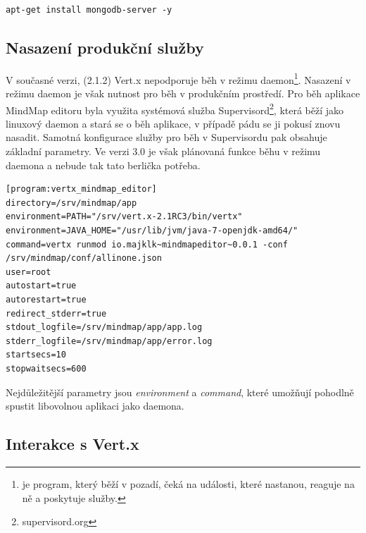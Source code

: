 \begin{lstlisting}
apt-get install mongodb-server -y
\end{lstlisting}

\subsection{Nasazení produkční služby}\label{sub:service}

V současné verzi, (2.1.2) Vert.x nepodporuje běh v režimu daemon\footnote{je program, který běží v pozadí, čeká na události, které nastanou, reaguje na ně a poskytuje služby.}. Nasazení v režimu daemon je však nutnost pro běh v produkčním prostředí. Pro běh aplikace MindMap editoru byla využita systémová služba Supervisord\footnote{supervisord.org}, která běží jako linuxový daemon a stará se o běh aplikace, v případě pádu se ji pokusí znovu nasadit. Samotná konfigurace služby pro běh v Supervisordu pak obsahuje základní parametry. Ve verzi 3.0 je však plánovaná funkce běhu v režimu daemona a nebude tak tato berlička potřeba.

\begin{lstlisting}[caption=Konfigurace produkční služby]
[program:vertx_mindmap_editor]
directory=/srv/mindmap/app
environment=PATH="/srv/vert.x-2.1RC3/bin/vertx"
environment=JAVA_HOME="/usr/lib/jvm/java-7-openjdk-amd64/"
command=vertx runmod io.majklk~mindmapeditor~0.0.1 -conf /srv/mindmap/conf/allinone.json
user=root
autostart=true
autorestart=true
redirect_stderr=true
stdout_logfile=/srv/mindmap/app/app.log
stderr_logfile=/srv/mindmap/app/error.log
startsecs=10
stopwaitsecs=600
\end{lstlisting}

Nejdůležitější parametry jsou \emph{environment} a \emph{command}, které umožňují pohodlně spustit libovolnou aplikaci jako daemona.

\subsection{Interakce s Vert.x}\label{sub:interaction}

